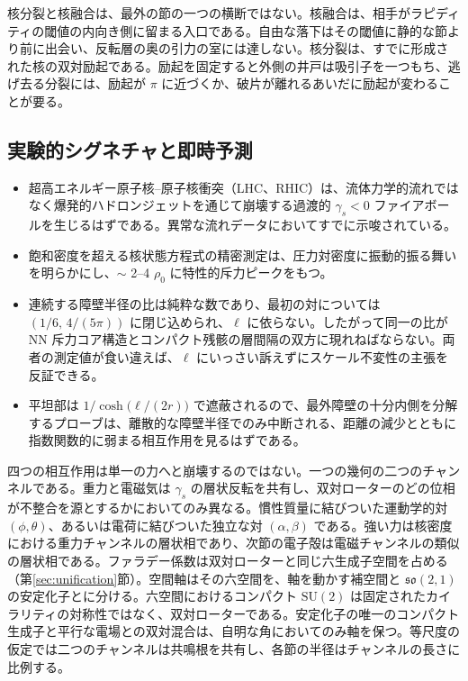 \documentclass[a4paper]{article}
\begin{document}
核分裂と核融合は、最外の節の一つの横断ではない。核融合は、相手がラピディティの閾値の内向き側に留まる入口である。自由な落下はその閾値に静的な節より前に出会い、反転層の奥の引力の室には達しない。核分裂は、すでに形成された核の双対励起である。励起を固定すると外側の井戸は吸引子を一つもち、逃げ去る分裂には、励起が \(\pi\) に近づくか、破片が離れるあいだに励起が変わることが要る。

\subsection{実験的シグネチャと即時予測}

\begin{itemize}
\item 超高エネルギー原子核--原子核衝突（LHC、RHIC）は、流体力学的流れではなく爆発的ハドロンジェットを通じて崩壊する過渡的 \(\gamma_s<0\) ファイアボールを生じるはずである。異常な流れデータにおいてすでに示唆されている。
\item 飽和密度を超える核状態方程式の精密測定は、圧力対密度に振動的振る舞いを明らかにし、$\sim$ 2–4 $\rho_0$ に特性的斥力ピークをもつ。
\item 連続する障壁半径の比は純粋な数であり、最初の対については \((1/6,\,4/(5\pi))\) に閉じ込められ、\(\ell\) に依らない。したがって同一の比が NN 斥力コア構造とコンパクト残骸の層間隔の双方に現れねばならない。両者の測定値が食い違えば、\(\ell\) にいっさい訴えずにスケール不変性の主張を反証できる。
\item 平坦部は \(1/\cosh\bigl(\ell/(2r)\bigr)\) で遮蔽されるので、最外障壁の十分内側を分解するプローブは、離散的な障壁半径でのみ中断される、距離の減少とともに指数関数的に弱まる相互作用を見るはずである。
\end{itemize}

四つの相互作用は単一の力へと崩壊するのではない。一つの幾何の二つのチャンネルである。重力と電磁気は \(\gamma_s\) の層状反転を共有し、双対ローターのどの位相が不整合を源とするかにおいてのみ異なる。慣性質量に結びついた運動学的対 $(\phi, \theta)$、あるいは電荷に結びついた独立な対 $(\alpha, \beta)$ である。強い力は核密度における重力チャンネルの層状相であり、次節の電子殻は電磁チャンネルの類似の層状相である。ファラデー係数は双対ローターと同じ六生成子空間を占める（第\ref{sec:unification}節）。空間軸はその六空間を、軸を動かす補空間と $\mathfrak{so}(2,1)$ の安定化子とに分ける。六空間におけるコンパクト $\mathrm{SU}(2)$ は固定されたカイラリティの対称性ではなく、双対ローターである。安定化子の唯一のコンパクト生成子と平行な電場との双対混合は、自明な角においてのみ軸を保つ。等尺度の仮定では二つのチャンネルは共鳴根を共有し、各節の半径はチャンネルの長さに比例する。
\end{document}
